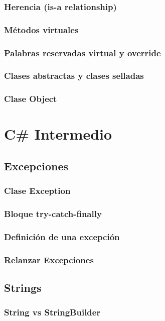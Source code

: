 \documentclass[12pt,a4paper]{report}
\begin{document}
\section{Herencia (is-a relationship)}
\section{Métodos virtuales}
\section{Palabras reservadas virtual y override}
\section{Clases abstractas y clases selladas}
\section{Clase Object}

\part{C\# Intermedio}

\chapter{Excepciones}
\section{Clase Exception}
\section{Bloque try-catch-finally}
\section{Definición de una excepción}
\section{Relanzar Excepciones}

\chapter{Strings}
\section{String vs StringBuilder}
\end{document}
